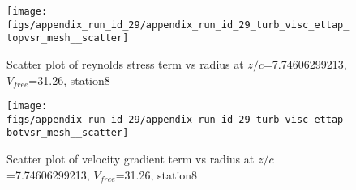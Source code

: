 \begin{figure}[H]
\centering
\texttt{[image: figs/appendix\_run\_id\_29/appendix\_run\_id\_29\_turb\_visc\_ettap\_topvsr\_mesh\_\_scatter]}
\caption{Scatter plot of reynolds stress term vs radius at $z/c$=7.74606299213, $V_{free}$=31.26, station8}
\label{fig:appendix_run_id_29_turb_visc_ettap_topvsr_mesh__scatter}
\end{figure}


\begin{figure}[H]
\centering
\texttt{[image: figs/appendix\_run\_id\_29/appendix\_run\_id\_29\_turb\_visc\_ettap\_botvsr\_mesh\_\_scatter]}
\caption{Scatter plot of velocity gradient term vs radius at $z/c$=7.74606299213, $V_{free}$=31.26, station8}
\label{fig:appendix_run_id_29_turb_visc_ettap_botvsr_mesh__scatter}
\end{figure}


